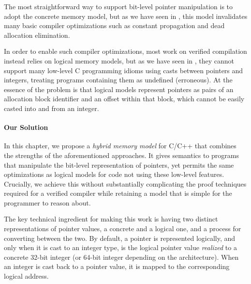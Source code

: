 The most straightforward way to support bit-level pointer manipulation is to adopt the concrete
memory model, but as we have seen in , this model
invalidates many basic compiler optimizations such as constant propagation and dead allocation
elimination.


In order to enable such compiler optimizations, most work on verified compilation instead relies on
logical memory models, but as we have seen in , they cannot support many
low-level C programming idioms using casts between pointers and integers, treating programs
containing them as undefined (\ie erroneous).  At the essence of the problem is that logical models
represent pointers as pairs of an allocation block identifier and an offset within that block, which
cannot be easily casted into and from an integer.


\paragraph{Our Solution}

In this chapter, we propose a \emph{hybrid memory model} for C/C++ that combines the strengths of the
aforementioned approaches. It gives semantics to programs that manipulate the bit-level
representation of pointers, yet permits the same optimizations as logical models for code not using
these low-level features. Crucially, we achieve this without substantially complicating the proof
techniques required for a verified compiler while retaining a model that is simple for the
programmer to reason about.

The key technical ingredient for making this work is having two
distinct representations of pointer values, a concrete and a logical one,
and a process for converting between the two.
By default, a pointer is represented logically, and only when it is
cast to an integer type, is the logical pointer value
\emph{realized} to a concrete 32-bit integer (or 64-bit integer depending on the architecture).
When an integer is cast back to a pointer value, 
it is mapped to the corresponding logical address.

